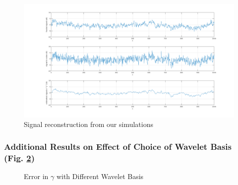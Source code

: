 \documentclass[a4paper]{article}
\begin{document}
\begin{figure}[ht]
\includegraphics[width=\textwidth]{reconstruction.png}
\caption{Signal reconstruction from our simulations}
\label{fig:reconstr_sim}
\end{figure}

\subsubsection{Additional Results on Effect of Choice of Wavelet Basis (Fig. \ref{fig:gamma_wavelet})}

\begin{figure}[ht]
    \centering
   \qquad
    \caption{Error in $\gamma$ with Different Wavelet Basis}%
    \label{fig:gamma_wavelet}%
\end{figure}
\end{document}
